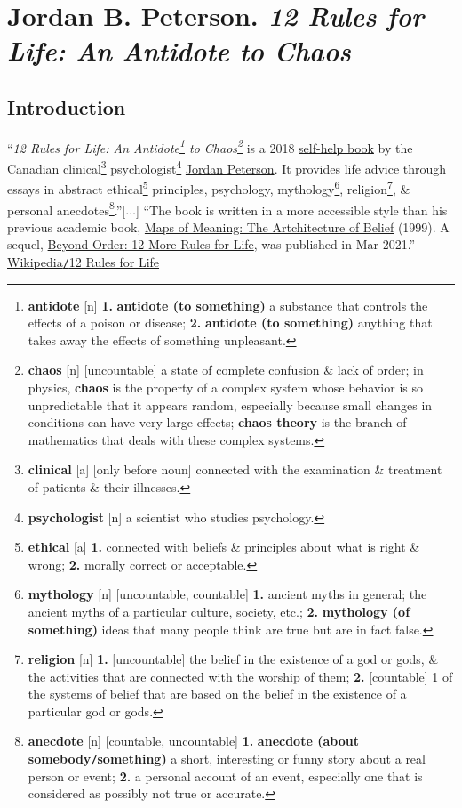 \documentclass[oneside]{book}
\numberwithin{equation}{section}
\begin{document}

\chapter{Jordan B. Peterson. \textit{12 Rules for Life: An Antidote to Chaos}}

\section*{Introduction}
``\textit{12 Rules for Life: An Antidote\footnote{\textbf{antidote} [n] \textbf{1.} \textbf{antidote (to something)} a substance that controls the effects of a poison or disease; \textbf{2.} \textbf{antidote (to something)} anything that takes away the effects of something unpleasant.} to Chaos\footnote{\textbf{chaos} [n] [uncountable] a state of complete confusion \& lack of order; in physics, \textbf{chaos} is the property of a complex system whose behavior is so unpredictable that it appears random, especially because small changes in conditions can have very large effects; \textbf{chaos theory} is the branch of mathematics that deals with these complex systems.}} is a 2018 \href{https://en.wikipedia.org/wiki/Self-help_book}{self-help book} by the Canadian clinical\footnote{\textbf{clinical} [a] [only before noun] connected with the examination \& treatment of patients \& their illnesses.} psychologist\footnote{\textbf{psychologist} [n] a scientist who studies psychology.} \href{https://en.wikipedia.org/wiki/Jordan_Peterson}{Jordan Peterson}. It provides life advice through essays in abstract ethical\footnote{\textbf{ethical} [a] \textbf{1.} connected with beliefs \& principles about what is right \& wrong; \textbf{2.} morally correct or acceptable.} principles, psychology, mythology\footnote{\textbf{mythology} [n] [uncountable, countable] \textbf{1.} ancient myths in general; the ancient myths of a particular culture, society, etc.; \textbf{2.} \textbf{mythology (of something)} ideas that many people think are true but are in fact false.}, religion\footnote{\textbf{religion} [n] \textbf{1.} [uncountable] the belief in the existence of a god or gods, \& the activities that are connected with the worship of them; \textbf{2.} [countable] 1 of the systems of belief that are based on the belief in the existence of a particular god or gods.}, \& personal anecdotes\footnote{\textbf{anecdote} [n] [countable, uncountable] \textbf{1.} \textbf{anecdote (about somebody\texttt{/}something)} a short, interesting or funny story about a real person or event; \textbf{2.} a personal account of an event, especially one that is considered as possibly not true or accurate.}.''[$\ldots$] ``The book is written in a more accessible style than his previous academic book, \href{https://en.wikipedia.org/wiki/Maps_of_Meaning:_The_Architecture_of_Belief}{Maps of Meaning: The Artchitecture of Belief} (1999). A sequel, \href{https://en.wikipedia.org/wiki/Beyond_Order}{Beyond Order: 12 More Rules for Life}, was published in Mar 2021.'' -- \href{https://en.wikipedia.org/wiki/12_Rules_for_Life}{Wikipedia\texttt{/}12 Rules for Life}
\end{document}
